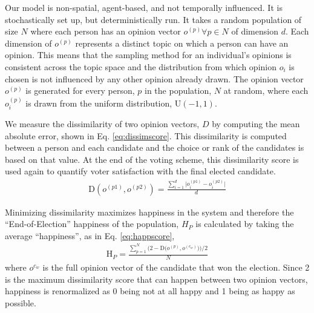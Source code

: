 
Our model is non-spatial, agent-based, and not temporally influenced.
It is stochastically set up, but deterministically run.
It takes a random population of size $N$ where each person has an opinion vector $o^{(p)} \forall p \in N$ of dimension $d$.
Each dimension of $o^{(p)}$ represents a distinct topic on which a person can have an opinion.
This means that the sampling method for an individual's opinions is consistent across the topic space and the distribution from which opinion $o_i$ is chosen is not influenced by any other opinion already drawn.
The opinion vector $o^{(p)}$ is generated for every person, $p$ in the population, $N$ at random, where each $o^{(p)}_i$ is drawn from the uniform distribution, U$(-1,1)$.

We measure the dissimilarity of two opinion vectors, $D$ by computing the mean absolute error, shown in Eq. \ref{eq:dissimscore}.
This dissimilarity is computed between a person and each candidate and the choice or rank of the candidates is based on that value.
At the end of the voting scheme, this dissimilarity score is used again to quantify voter satisfaction with the final elected candidate.
\begin{align}
\text{D}(o^{(p1)},o^{(p2)}) = \frac{\sum_{i=1}^{d}\Big|o^{(p1)}_i - o^{(p2)}_i\Big|}{d}
\label{eq:dissimscore}
\end{align}

Minimizing dissimilarity maximizes happiness in the system and therefore the ``End-of-Election'' happiness of the population, $H_P$ is calculated by taking the average ``happiness'', as in Eq. \ref{eq:happscore},
\begin{align}
\text{H}_{P} =
\frac{\sum_{p=1}^{N} \Big(2 - \text{D} \big(o^{(p)},o^{(c_w)}\big)\Big) / 2 }{N}
\label{eq:happscore}
\end{align}
where $o^{c_w}$ is the full opinion vector of the candidate that won the election.
Since 2 is the maximum dissimilarity score that can happen between two opinion vectors, happiness is renormalized as 0 being not at all happy and 1 being as happy as possible.

